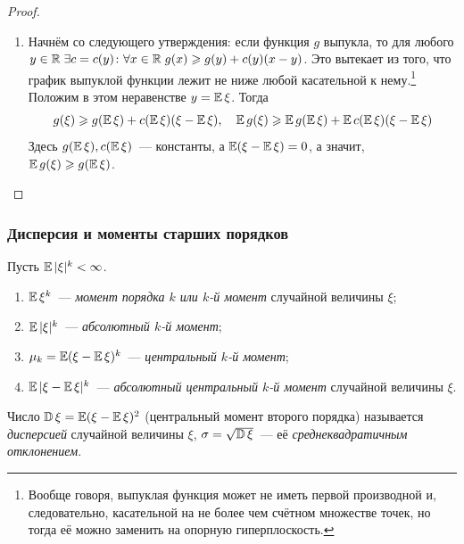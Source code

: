 \begin{proof}
\begin{enumerate}
    \item 
        Начнём со следующего утверждения: если функция $g$ выпукла, то для любого ${y \in \mathbb{R}} \; {\exists c = c(y) \colon} \forall x \in \mathbb{R} \; g(x) \geqslant g(y) + c(y)(x - y)$. Это вытекает из того, что график выпуклой функции лежит не ниже любой касательной к нему.\footnote{Вообще говоря, выпуклая функция может не иметь первой производной и, следовательно, касательной на не более чем счётном множестве точек, но тогда её можно заменить на опорную гиперплоскость.} Положим в этом неравенстве $y = \operatorname{\mathbb{E}} \xi$. 
        Тогда
        \begin{equation*}
            g(\xi) \geqslant g(\operatorname{\mathbb{E}} \xi) + c(\operatorname{\mathbb{E}} \xi)(\xi - \operatorname{\mathbb{E}} \xi), \quad \operatorname{\mathbb{E}} g(\xi) \geqslant \operatorname{\mathbb{E}} g(\operatorname{\mathbb{E}} \xi) +  \operatorname{\mathbb{E}} c(\operatorname{\mathbb{E}} \xi)(\xi - \operatorname{\mathbb{E}} \xi)
        \end{equation*}
        Здесь $g(\operatorname{\mathbb{E}} \xi), c(\operatorname{\mathbb{E}} \xi)$~--- константы, а $\operatorname{\mathbb{E}} (\xi - \operatorname{\mathbb{E}} \xi) = 0$, а значит, \\ $ \operatorname{\mathbb{E}} g(\xi) \geqslant g(\operatorname{\mathbb{E}} \xi)$.
        \qedhere
\end{enumerate}
\end{proof}

\subsubsection{Дисперсия и моменты старших порядков}

\begin{defn}
    Пусть ${\operatorname{\mathbb{E}} |\xi|^k < \infty}$. 
    \begin{enumerate}
        \item 
            ${\operatorname{\mathbb{E}} \xi^k}$~--- \textit{момент порядка $k$ или $k$-й момент} случайной величины $\xi$;
        \item 
            ${\operatorname{\mathbb{E}} |\xi|^k}$~--- \textit{абсолютный $k$-й момент};
        \item 
            $\mu_k = {\operatorname{\mathbb{E}} (\xi - \operatorname{\mathbb{E}} \xi)^k}$~--- \textit{центральный $k$-й момент};
        \item 
            ${\operatorname{\mathbb{E}} |\xi - \operatorname{\mathbb{E}} \xi|^k}$~--- \textit{абсолютный центральный $k$-й момент} случайной величины $\xi$.
    \end{enumerate}
\end{defn}

\begin{defn}
    Число $\operatorname{\mathbb{D}}\xi = \operatorname{\mathbb{E}} (\xi - \operatorname{\mathbb{E}} \xi)^2$ (центральный момент второго порядка) называется \textit{дисперсией} случайной величины $\xi$, $\sigma = \sqrt{\operatorname{\mathbb{D}}\xi}$~--- её \textit{среднеквадратичным отклонением}.
\end{defn} 

